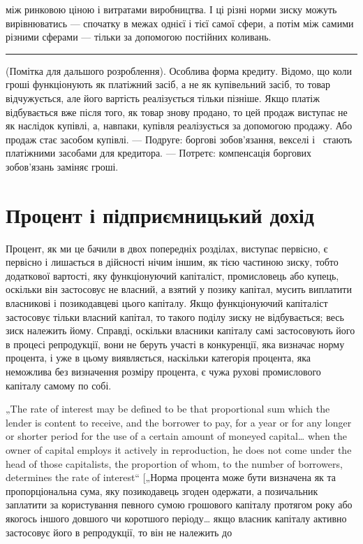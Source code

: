 \parcont{}  %
між ринковою ціною і витратами виробництва. І ці різні норми
зиску можуть вирівнюватись — спочатку в межах однієї і тієї
самої сфери, а потім між самими різними сферами — тільки за
допомогою постійних коливань.

\plainbreak{3}

(Помітка для дальшого розроблення). Особлива форма кредиту.
Відомо, що коли гроші функціонують як платіжний засіб,
а не як купівельний засіб, то товар відчужується, але його
вартість реалізується тільки пізніше. Якщо платіж відбувається
вже після того, як товар знову продано, то цей продаж виступає
не як наслідок купівлі, а, навпаки, купівля реалізується за
допомогою продажу. Або продаж стає засобом купівлі. — Подруге:
боргові зобов’язання, векселі і~ стають платіжними
засобами для кредитора. — Потретє: компенсація боргових зобов’язань
заміняє гроші.

\section{Процент і підприємницький дохід}

Процент, як ми це бачили в двох попередніх розділах, виступає
первісно, є первісно і лишається в дійсності нічим
іншим, як тією частиною зиску, тобто додаткової вартості,
яку функціонуючий капіталіст, промисловець або купець,
оскільки він застосовує не власний, а взятий у позику капітал,
мусить виплатити власникові і позикодавцеві цього капіталу.
Якщо функціонуючий капіталіст застосовує тільки власний капітал,
то такого поділу зиску не відбувається; весь зиск належить
йому. Справді, оскільки власники капіталу самі застосовують
його в процесі репродукції, вони не беруть участі в
конкуренції, яка визначає норму процента, і уже в цьому виявляється,
наскільки категорія процента, яка неможлива без визначення
розміру процента, є чужа рухові промислового капіталу
самому по собі.

„The rate of interest may be defined to be that proportional sum
which the lender is content to receive, and the borrower to pay, for
a year or for any longer or shorter period for the use of a certain
amount of moneyed capital\dots{} when the owner of capital employs
it actively in reproduction, he does not come under the head of
those capitalists, the proportion of whom, to the number of borrowers,
determines the rate of interest“ [„Норма процента може
бути визначена як та пропорціональна сума, яку позикодавець
згоден одержати, а позичальник заплатити за користування певного
сумою грошового капіталу протягом року або якогось іншого
довшого чи коротшого періоду\dots{} якщо власник капіталу
активно застосовує його в репродукції, то він не належить до
\parbreak{}  %
